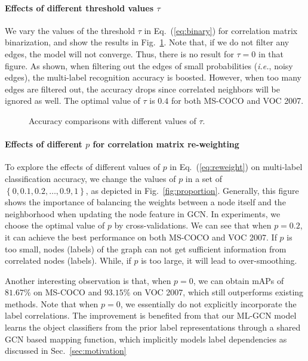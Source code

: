 \documentclass[10pt,twocolumn,letterpaper]{article}
\begin{document}
\paragraph{Effects of different threshold values $\tau$}

We vary the values of the threshold $\tau$ in Eq.~(\ref{eq:binary}) for correlation matrix binarization, and show the results in Fig.~\ref{fig:threshold}. Note that, if we do not filter any edges, the model will not converge. Thus, there is no result for $\tau = 0$ in that figure. As shown, when filtering out the edges of small probabilities (\emph{i.e.}, noisy edges), the multi-label recognition accuracy is boosted. However, when too many edges are filtered out, the accuracy drops since correlated neighbors will be ignored as well. The optimal value of $\tau$ is $0.4$ for both MS-COCO and VOC 2007.

\begin{figure}[t]
	\centering
	\caption{Accuracy comparisons with different values of $\tau$.}
	\label{fig:threshold}
\end{figure}

\paragraph{Effects of different $p$ for correlation matrix re-weighting}

To explore the effects of different values of $p$ in Eq.~(\ref{eq:reweight}) on multi-label classification accuracy, we change the values of $p$ in a set of $\left\{0,0.1, 0.2, \ldots, 0.9, 1\right\}$, as depicted in Fig.~\ref{fig:proportion}. Generally, this figure shows the importance of balancing the weights between a node itself and the neighborhood when updating the node feature in GCN. In experiments, we choose the optimal value of $p$ by cross-validations. We can see that when $p=0.2$, it can achieve the best performance on both MS-COCO and VOC 2007. If $p$ is too small, nodes (labels) of the graph can not get sufficient information from correlated nodes (labels). While, if $p$ is too large, it will lead to over-smoothing. 

Another interesting observation is that, when $p=0$, we can obtain mAPs of $81.67\%$ on MS-COCO and $93.15\%$ on VOC 2007, which still outperforms existing methods. Note that when $p=0$, we essentially do not explicitly incorporate the label correlations. The improvement is benefited from that our ML-GCN model learns the object classifiers from the prior label representations through a shared GCN based mapping function, which implicitly models label dependencies as discussed in Sec.~\ref{sec:motivation}
\end{document}

